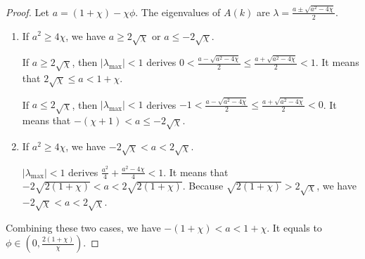 \documentclass{sig-alternate}
\begin{document}
\begin{proof}
Let $ a = (1 + \chi) - \chi \phi $. 
The eigenvalues of $ A(k) $ are
$ \lambda = \frac{ a \pm \sqrt{ a^{2} - 4 \chi } }{2} $.
		
\begin{enumerate}
\item If $ a^{2} \geq 4 \chi $, we have $ a \geq 2 \sqrt{\chi} $ or $ a \leq - 2 \sqrt{\chi} $.
			
If $ a \geq 2 \sqrt{\chi} $, then $ | \lambda_{\max} | < 1 $ derives $ 0 < \frac{a-\sqrt{a^{2}-4\chi}}{2} \leq \frac{a+\sqrt{a^{2}-4\chi}}{2} < 1 $.
It means that $ 2 \sqrt{ \chi } \leq a < 1 + \chi $.
			
If $ a \leq 2 \sqrt{\chi} $, then $ | \lambda_{\max} | < 1 $ derives $ -1 < \frac{a-\sqrt{a^{2}-4\chi}}{2} \leq \frac{a+\sqrt{a^{2}-4\chi}}{2} < 0 $.
It means that $ - (\chi+1) < a \leq - 2 \sqrt{\chi} $.
			
\item If $ a^{2} \geq 4 \chi $, we have $ - 2 \sqrt{\chi} < a < 2 \sqrt{\chi} $.
			
$ | \lambda_{\max} | < 1 $ derives $ \frac{ a^{2} }{4} + \frac{ a^{2} - 4\chi }{4} < 1 $.
It means that $ - 2 \sqrt{ 2(1+\chi) } < a < 2 \sqrt{ 2(1+\chi) } $.
Because $ \sqrt{ 2(1+\chi) } > 2 \sqrt{ \chi } $, we have $ - 2 \sqrt{\chi} < a < 2 \sqrt{\chi} $.
\end{enumerate}
Combining these two cases, we have  $ - (1 + \chi) < a < 1 + \chi $.
It equals to $ \phi \in (0 , \frac{2(1+\chi)}{\chi} ) $.
		
\end{proof}		
		


\end{document}
